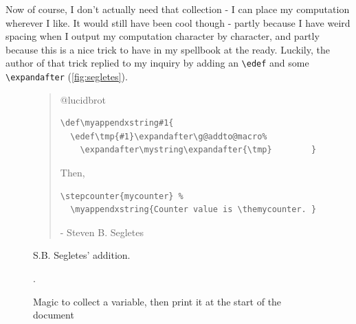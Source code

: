 \documentclass{article} \usepackage[utf8]{inputenc}
\makeatletter
\newcommand{\code}[1]{\colorbox{codebggray}{{\texttt{#1}}}}
\def\mystring{} %
\def\thefinalstring{} %
\def\myappendstring#1{\g@addto@macro\mystring{ #1}}
\def\myappendxstring#1{\edef\tmp{#1}\expandafter\g@addto@macro\expandafter\mystring\expandafter{\tmp}}
\makeatother
\begin{document}
\label{sec:magicexplain}Now of course, I don't actually need that collection - I can place my computation wherever I like. It would still have been cool though - partly because I have weird spacing when I output my computation character by character, and partly because this is a nice trick to have in my spellbook at the ready. Luckily, the author of that trick replied to my inquiry by adding an \code{\textbackslash edef} and some \cprotect\code{\verb|\expandafter|} (\autoref{fig:segletes}).

\begin{figure}
\begin{myquote}
\begin{quote}
@lucidbrot
\begin{lstlisting}[columns=fullflexible, backgroundcolor = \color{codebggray}]
\def\myappendxstring#1{
  \edef\tmp{#1}\expandafter\g@addto@macro%
    \expandafter\mystring\expandafter{\tmp}        }
\end{lstlisting}
Then, \begin{lstlisting}[columns=fullflexible, backgroundcolor = \color{codebggray}]
\stepcounter{mycounter} %
  \myappendxstring{Counter value is \themycounter. }
\end{lstlisting}
 - Steven B. Segletes 
 \end{quote}
\end{myquote}
\caption{S.B. Segletes' addition.}
\label{fig:segletes}
\end{figure}


\begin{figure}[htbp]
\begin{samepage}
\begin{mycode}
\myappendstring{hello}
\makeatletter
{}%
\makeatother
\thefinalstring
\addtocontents{xyz}{\gdef\protect\thefinalstring{\mystring}}
\end{mycode}
\caption{Magic to collect a variable, then print it at the start of the document~}.
\label{fig:magic}
\end{samepage}
\end{figure}
\end{document}

